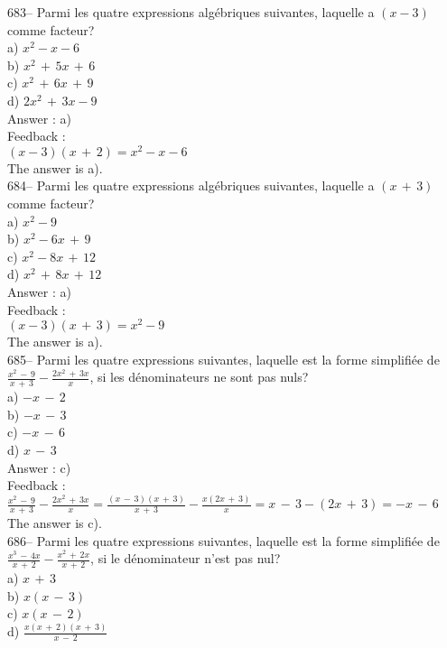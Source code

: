 \documentclass[letterpaper, 12pt]{article}
\begin{document}
683-- Parmi les quatre expressions alg\'ebriques suivantes, laquelle a
$\left( x-3\right)$ comme facteur?\\
a) $x^{2}-x-6$\\
b) $x^{2}\,+\,5x\,+\,6$\\
c) $x^{2}\,+\,6x\,+\,9$\\
d) $2x^{2}\,+\,3x-9$\\

Answer : a)\\

Feedback : \\
$(x-3)(x\,+\,2)=x^{2}-x-6$\\
The answer is a).\\

684-- Parmi les quatre expressions alg\'ebriques suivantes, laquelle a
$\left( x\,+\,3\right) $ comme facteur?\\
a) $x^{2}-9$\\
b) $x^{2}-6x\,+\,9$\\
c) $x^{2}-8x\,+\,12$\\
d) $x^{2}\,+\,8x\,+\,12$\\

Answer : a)\\

Feedback : \\
$\left( x-3\right) \left( x\,+\,3\right) = x^{2}-9$\\
The answer is a).\\

685-- Parmi les quatre expressions suivantes, laquelle est la forme
simplifi\'ee de $\frac{x^{2}\,-\,9}{x\,+\,3}-\frac{2x^{2}\,+\,3x}{x}$, si
les d\'enominateurs ne sont pas nuls?\\
a) $-x\,-\,2$\\
b) $-x\,-\,3$\\
c) $-x\,-\,6$\\
d) $x\,-\,3$\\

Answer : c)\\

Feedback : \\[2mm]
$\frac{x^{2}\,-\,9}{x\,+\,3}-\frac{2x^{2}\,+\,3x}{x}=\frac{\left(
x\,-\,3\right) \left( x\,+\,3\right) }{x\,+\,3} -\frac{x\left(
2x\,+\,3\right) }{x}=x\,-\,3-\left( 2x\,+\,3\right) =-x\,-\,6$\\[2mm]
The answer is c).\\

686-- Parmi les quatre expressions suivantes, laquelle est la forme
simplifi\'ee de $\frac{x^{3}\,-\,4x}{x\,+\,2}-\frac{x^{2}\,+\,2x}{x\,+\,2}$,
si le d\'enominateur n'est pas nul?\\
a) $ x\,+\,3$\\[2mm]
b) $x\left( x\,-\,3\right) $\\[2mm]
c) $x\left( x\,-\,2\right) $\\[2mm]
d) $\frac{x\left( x\,+\,2\right) \left( x\,+\,3\right)}{x\,-\,2}$\\
\end{document}

